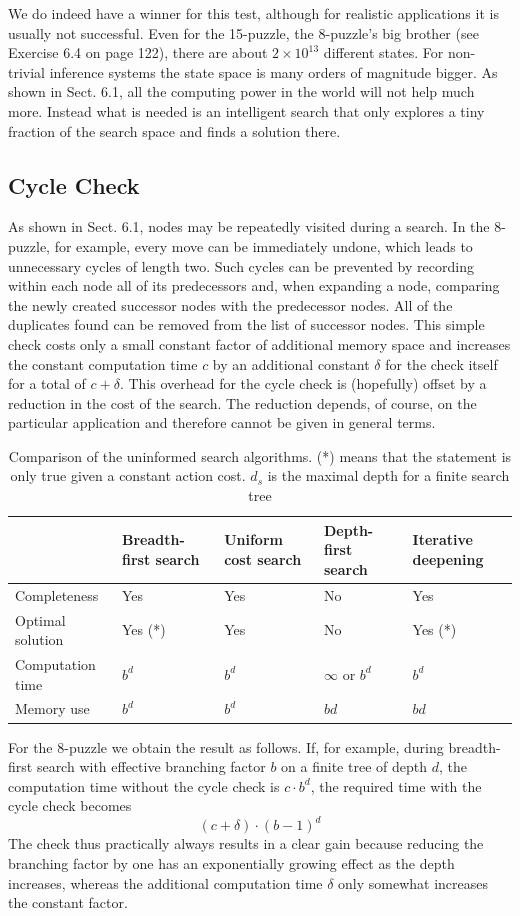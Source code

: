 \documentclass[10pt]{book}
\begin{document}
We do indeed have a winner for this test, although for realistic applications it is usually not successful. Even for the 15-puzzle, the 8-puzzle's big brother (see Exercise 6.4 on page 122), there are about $2 \times 10^{13}$ different states. For non-trivial inference systems the state space is many orders of magnitude bigger. As shown in Sect. 6.1, all the computing power in the world will not help much more. Instead what is needed is an intelligent search that only explores a tiny fraction of the search space and finds a solution there.

\subsection{Cycle Check}
As shown in Sect. 6.1, nodes may be repeatedly visited during a search. In the 8-puzzle, for example, every move can be immediately undone, which leads to unnecessary cycles of length two. Such cycles can be prevented by recording within each node all of its predecessors and, when expanding a node, comparing the newly created successor nodes with the predecessor nodes. All of the duplicates found can be removed from the list of successor nodes. This simple check costs only a small constant factor of additional memory space and increases the constant computation time $c$ by an additional constant $\delta$ for the check itself for a total of $c+\delta$. This overhead for the cycle check is (hopefully) offset by a reduction in the cost of the search. The reduction depends, of course, on the particular application and therefore cannot be given in general terms.

\begin{table}[ht]
\centering
\begin{tabular}{|l|l|l|l|l|}
\hline
 & Breadth-first search & Uniform cost search & Depth-first search & Iterative deepening \\
\hline
Completeness & Yes & Yes & No & Yes \\
\hline
Optimal solution & Yes (*) & Yes & No & Yes (*) \\
\hline
Computation time & $b^{d}$ & $b^{d}$ & $\infty$ or $b^{d}$ & $b^{d}$ \\
\hline
Memory use & $b^{d}$ & $b^{d}$ & $b d$ & $b d$ \\
\hline
\end{tabular}
\caption{Comparison of the uninformed search algorithms. (*) means that the statement is only true given a constant action cost. $d_{s}$ is the maximal depth for a finite search tree}
\end{table}
For the 8-puzzle we obtain the result as follows. If, for example, during breadth-first search with effective branching factor $b$ on a finite tree of depth $d$, the computation time without the cycle check is $c \cdot b^{d}$, the required time with the cycle check becomes
$$
(c+\delta) \cdot (b-1)^{d}
$$
The check thus practically always results in a clear gain because reducing the branching factor by one has an exponentially growing effect as the depth increases, whereas the additional computation time $\delta$ only somewhat increases the constant factor.
\end{document}
